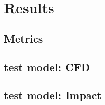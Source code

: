 \section{Results}
\subsection{Metrics}

\subsection{test model: CFD}

\subsection{test model: Impact}

